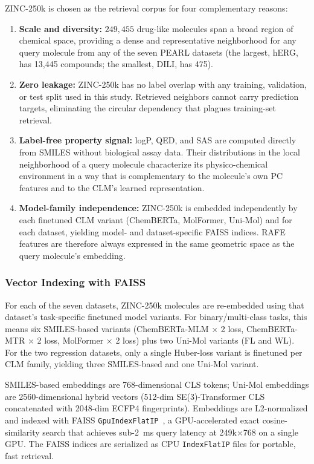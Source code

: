 \documentclass[pdflatex,sn-mathphys-num,Numbered]{sn-jnl}%
\begin{document}
ZINC-250k is chosen as the retrieval corpus for four complementary reasons:
\begin{enumerate}
  \item \textbf{Scale and diversity:} $249,455$ drug-like molecules span a broad region of chemical space, providing a dense and representative neighborhood for any query molecule from any of the seven PEARL datasets (the largest, hERG, has 13,445 compounds; the smallest, DILI, has 475).
  \item \textbf{Zero leakage:} ZINC-250k has no label overlap with any training, validation, or test split used in this study. Retrieved neighbors cannot carry prediction targets, eliminating the circular dependency that plagues training-set retrieval.
  \item \textbf{Label-free property signal:} logP, QED, and SAS are computed directly from SMILES without biological assay data. Their distributions in the local neighborhood of a query molecule characterize its physico-chemical environment in a way that is complementary to the molecule's own PC features and to the CLM's learned representation.
  \item \textbf{Model-family independence:} ZINC-250k is embedded independently by each finetuned CLM variant (ChemBERTa, MolFormer, Uni-Mol) and for each dataset, yielding model- and dataset-specific FAISS indices. RAFE features are therefore always expressed in the same geometric space as the query molecule's embedding.
\end{enumerate}

\subsubsection{Vector Indexing with FAISS}\label{sec:vector_faiss}
For each of the seven datasets, ZINC-250k molecules are re-embedded using that dataset's task-specific finetuned model variants. For binary/multi-class tasks, this means six SMILES-based variants (ChemBERTa-MLM $\times$ 2 loss, ChemBERTa-MTR $\times$ 2 loss, MolFormer $\times$ 2 loss) plus two Uni-Mol variants (FL and WL). For the two regression datasets, only a single Huber-loss variant is finetuned per CLM family, yielding three SMILES-based and one Uni-Mol variant.

SMILES-based embeddings are 768-dimensional CLS tokens; Uni-Mol embeddings are 2560-dimensional hybrid vectors (512-dim SE(3)-Transformer CLS concatenated with 2048-dim ECFP4 fingerprints). Embeddings are L2-normalized and indexed with FAISS \texttt{GpuIndexFlatIP}~\cite{johnson2021faiss}, a GPU-accelerated exact cosine-similarity search that achieves sub-2~ms query latency at 249k$\times$768 on a single GPU. The FAISS indices are serialized as CPU \texttt{IndexFlatIP} files for portable, fast retrieval.
\end{document}

